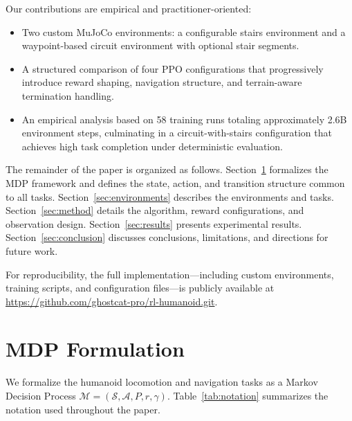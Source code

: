 \documentclass[conference]{IEEEtran}
\begin{document}
Our contributions are empirical and practitioner-oriented:
\begin{itemize}
    \item Two custom MuJoCo environments: a configurable stairs environment and a waypoint-based circuit environment with optional stair segments.
    \item A structured comparison of four PPO configurations that progressively introduce reward shaping, navigation structure, and terrain-aware termination handling.
    \item An empirical analysis based on 58 training runs totaling approximately 2.6B environment steps, culminating in a circuit-with-stairs configuration that achieves high task completion under deterministic evaluation.
\end{itemize}

The remainder of the paper is organized as follows. Section~\ref{sec:mdp} formalizes the MDP framework and defines the state, action, and transition structure common to all tasks. Section~\ref{sec:environments} describes the environments and tasks. Section~\ref{sec:method} details the algorithm, reward configurations, and observation design. Section~\ref{sec:results} presents experimental results. Section~\ref{sec:conclusion} discusses conclusions, limitations, and directions for future work.

For reproducibility, the full implementation---including custom environments, training scripts, and configuration files---is publicly available at \url{https://github.com/ghostcat-pro/rl-humanoid.git}.



\section{MDP Formulation}
\label{sec:mdp}

We formalize the humanoid locomotion and navigation tasks as a Markov Decision Process $\mathcal{M} = (\mathcal{S}, \mathcal{A}, P, r, \gamma)$. Table~\ref{tab:notation} summarizes the notation used throughout the paper.
\end{document}
